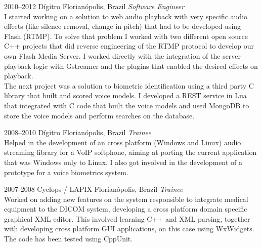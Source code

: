 \documentclass[]{friggeri-cv} %
\begin{document}
\begin{entrylist}
\entry
{2010--2012}
{Dígitro}
{Florianópolis, Brazil}
{\emph{Software Engineer} \\

I started working on a solution to web audio playback
with very specific audio effects (like silence removal,
change in pitch) that had to be developed using Flash (RTMP).
To solve that problem I worked with
two different open source C++ projects that did reverse
engineering of the RTMP protocol to develop our own
Flash Media Server. I worked directly with the integration
of the server playback logic with Gstreamer and the plugins
that enabled the desired effects on playback. \\

The next project was a solution to biometric identification
using a third party C library that built and scored voice models.
I developed a REST service in Lua that integrated with C code
that built the voice models and used MongoDB to store the
voice models and perform searches on the database. \\
}
\end{entrylist}
\begin{entrylist}
\entry
{2008--2010}
{Dígitro}
{Florianópolis, Brazil}
{\emph{Trainee} \\

Helped in the development of an
cross platform (Windows and Linux) audio streaming
library for a VoIP softphone, aiming at porting
the current application that was Windows only to Linux. I also
got involved in the development of a prototype for a voice
biometrics system.
}
\end{entrylist}
\begin{entrylist}
\entry
{2007-2008}
{Cyclops / LAPIX}
{Florianópolis, Brazil}
{\emph{Trainee} \\

Worked on adding new features on the system responsible to
integrate medical equipment to the DICOM system, developing a
cross platform domain specific graphical XML editor.
This involved learning C++ and XML parsing, together with
developing cross platform GUI applications, on this case
using WxWidgets. The code has been tested using CppUnit.
}
\end{entrylist}
\end{document}
